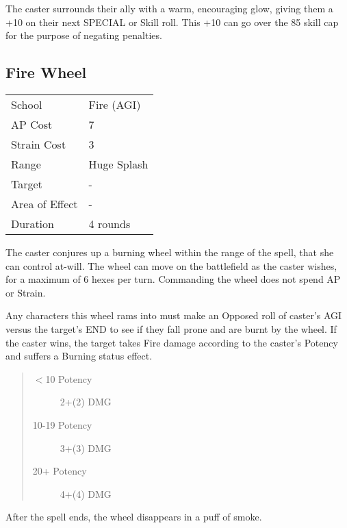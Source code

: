\documentclass[11pt,a4paper,twocolumn]{book}
\begin{document}
\medskip

The caster surrounds their ally with a warm, encouraging glow, giving them a +10 on their next SPECIAL or Skill roll. This +10 can go over the 85 skill cap for the purpose of negating penalties.

\subsection*{Fire Wheel}
{
	\begin{tabu} to 75mm{| X[l,4] | X[l,7] |}
		\hline
		School 			&  Fire (AGI)			\\
		AP Cost	      	&  7					\\
		Strain Cost     &  3					\\
		Range     		&  Huge Splash		\\
		Target      	&  -					\\
		Area of Effect  &  -	 				\\
		Duration     	&  4 rounds		\\ \hline
	\end{tabu}
	
}

\medskip

The caster conjures up a burning wheel within the range of the spell, that she can control at-will. The wheel can move on the battlefield as the caster wishes, for a maximum of 6 hexes per turn. Commanding the wheel does not spend AP or Strain. 

Any characters this wheel rams into must make an Opposed roll of caster's AGI versus the target's END to see if they fall prone and are burnt by the wheel. If the caster wins, the target takes Fire damage according to the caster's Potency and suffers a Burning status effect.

\begin{quote}
	\begin{description}
		\item[$<$10 Potency] 	2+(2) DMG
		\item[10-19 Potency] 	3+(3) DMG
		\item[20+ Potency]  	4+(4) DMG
	\end{description}	
\end{quote}

After the spell ends, the wheel disappears in a puff of smoke.
\end{document}
